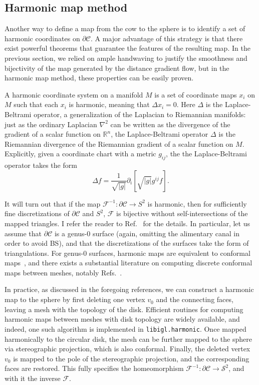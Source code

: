 \documentclass[
    prd, twocolumn, nofootinbib, amsmath, amssymb,
    aps, floatfix, preprintnumbers
]{revtex4-2}
\newcommand{\refcite}[1]{Ref.~\cite{#1}}
\newcommand{\refscite}[1]{Refs.~\cite{#1}}
\begin{document}
\subsection{Harmonic map method}
Another way to define a map from the cow to the sphere is to identify a set of harmonic coordinates on $\partial\mathcal C$. A major advantage of this strategy is that there exist powerful theorems that guarantee the features of the resulting map. In the previous section, we relied on ample handwaving to justify the smoothness and bijectivity of the map generated by the distance gradient flow, but in the harmonic map method, these properties can be easily proven.

A harmonic coordinate system on a manifold $M$ is a set of coordinate maps $x_i$ on $M$ such that each $x_i$ is harmonic, meaning that $\Delta x_i = 0$. Here $\Delta$ is the Laplace-Beltrami operator, a generalization of the Laplacian to Riemannian manifolds: just as the ordinary Laplacian $\nabla^2$ can be written as the divergence of the gradient of a scalar function on $\mathbb R^n$, the Laplace-Beltrami operator $\Delta$ is the Riemannian divergence of the Riemannian gradient of a scalar function on $M$. Explicitly, given a coordinate chart with a metric $g_{ij}$, the the Laplace-Beltrami operator takes the form
\begin{equation}
    \Delta f = \frac{1}{\sqrt{|g|}}\partial_i\left[
        \sqrt{|g|}g^{ij}f
    \right]
    .
\end{equation}

It will turn out that if the map $\mathcal F^{-1}\colon \partial\mathcal C\to S^2$ is harmonic, then for sufficiently fine discretizations of $\partial\mathcal C$ and $S^2$, $\mathcal F$ is bijective without self-intersections of the mapped triangles. I refer the reader to \refcite{floater:2005} for the details. In particular, let us assume that $\partial\mathcal C$ is a genus-0 surface (again, omitting the alimentary canal in order to avoid BS), and that the discretizations of the surfaces take the form of triangulations. For genus-0 surfaces, harmonic maps are equivalent to conformal maps~\cite{Gu:2002}, and there exists a substantial literature on computing discrete conformal maps between meshes, notably \refscite{Kharevych:2006,Springborn:2008}.

In practice, as discussed in the foregoing references, we can construct a harmonic map to the sphere by first deleting one vertex $v_0$ and the connecting faces, leaving a mesh with the topology of the disk. Efficient routines for computing harmonic maps between meshes with disk topology are widely available, and indeed, one such algorithm is implemented in \texttt{libigl.harmonic}. Once mapped harmonically to the circular disk, the mesh can be further mapped to the sphere via stereographic projection, which is also conformal. Finally, the deleted vertex $v_0$ is mapped to the pole of the stereographic projection, and the corresponding faces are restored. This fully specifies the homeomorphism $\mathcal F^{-1}\colon\partial\mathcal C\to\mathcal S^2$, and with it the inverse $\mathcal F$.
\end{document}
